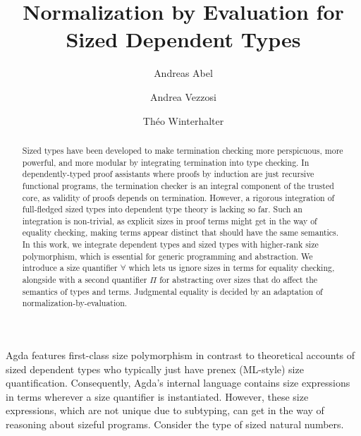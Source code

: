 \documentclass[a4paper]{easychair}
\title{Normalization by Evaluation for Sized Dependent Types}
\author{
  Andreas Abel\inst{1}
  \and
  Andrea Vezzosi\inst{1}
  \and
  Th\'{e}o Winterhalter\inst{2}
}
\institute{
  Department of Computer Science and Eng., Gothenburg
  University, Sweden \\
  \texttt{\{abela,vezzosi\}@chalmers.se}
  \and
  \' Ecole Normale Supérieure de Cachan, France \\
  \texttt{theo.winterhalter@ens-cachan.fr}
}
\begin{document}
\maketitle

\begin{abstract}

Sized types have been developed to make termination checking more
perspicuous, more powerful, and more modular by integrating
termination into type checking.  In dependently-typed proof
assistants where proofs by induction are just recursive functional
programs, the termination checker is an integral component of the
trusted core, as validity of proofs depends on termination.
However, a rigorous integration of full-fledged sized types into
dependent type theory is lacking so far.  Such an integration is
non-trivial, as explicit sizes in proof terms might get in the way
of equality checking, making terms appear distinct that should have
the same semantics.
%
In this work, we integrate dependent types and sized types with
higher-rank size polymorphism, which is essential for generic
programming and abstraction.  We introduce a size quantifier $\forall$
which lets us ignore sizes in terms for equality checking, alongside
with a second quantifier $\Pi$ for abstracting over sizes that do
affect the semantics of types and terms.  Judgmental equality is
decided by an adaptation of normalization-by-evaluation.
\end{abstract}


\medskip

Agda \cite{agdawiki} features first-class size polymorphism
\cite{abel:fics12} in contrast to theoretical accounts of sized
dependent types
\cite{bartheGregoirePastawski:lpar06,blanqui:rta04,sacchini:lics13}
who typically just have prenex (ML-style) size quantification.
Consequently, Agda's internal language contains size expressions in
terms wherever a size quantifier is instantiated.  However, these
size expressions, which are not unique due to subtyping, can get in
the way of reasoning about sizeful programs.
Consider the type of sized natural numbers.



\end{document}
